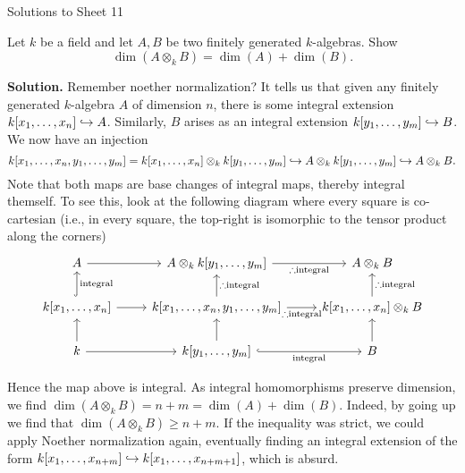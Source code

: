 \documentclass[a4paper,11pt]{article}
\begin{document}
\begin{center}
    \huge{Solutions to Sheet 11}
\end{center}

Let $k$ be a field and let $A,B$ be two finitely generated $k$-algebras.
Show 
\begin{equation*}
    \dim(A \otimes_k B) = \dim(A) + \dim(B).
\end{equation*}

\textbf{Solution.} Remember noether normalization? It tells us that given
any finitely generated $k$-algebra $A$ of dimension $n$, there is some 
integral extension $k[x_1, \dots, x_n] \hookrightarrow A$. Similarly, $B$ arises
as an integral extension $k[y_1, \dots, y_m] \hookrightarrow B$. 
We now have an injection
\begin{equation*}
    k[x_1, \dots, x_n, y_1, \dots, y_m] = k[x_1, \dots, x_n] \otimes_k k[y_1, \dots, y_m] 
    \hookrightarrow A \otimes_k k[y_1, \dots, y_m] \hookrightarrow A \otimes_k B.
\end{equation*}
Note that both maps are base changes of integral maps, thereby integral
themself. To see this, look at the following diagram where every
square is co-cartesian (i.e., in every square, the top-right is isomorphic to
the tensor product along the corners)
\begin{equation*}
\begin{tikzcd}[ampersand replacement=\&]
	A \& {A \otimes_k k[y_1, \dots, y_m] } \& {A \otimes_k B} \\
    {k[x_1, \dots, x_n]} \& {k[x_1, \dots, x_n, y_1, \dots, y_m]} \& {k[x_1, \dots, x_n] \otimes_k B} \\
	k \& {k[y_1, \dots, y_m]} \& B
	\arrow[from=3-2, to=2-2]
	\arrow[from=3-1, to=3-2]
	\arrow[from=3-1, to=2-1]
	\arrow[from=2-1, to=2-2]
	\arrow["{\text{integral}}"', hook, from=3-2, to=3-3]
	\arrow[from=3-3, to=2-3]
	\arrow["{\therefore \text{integral}}"', from=2-2, to=2-3]
	\arrow["{\text{integral}}"',hook, from=2-1, to=1-1]
	\arrow["{\therefore \text{integral}}"', from=2-2, to=1-2]
	\arrow[from=1-1, to=1-2]
	\arrow["{\therefore \text{integral}}"', from=1-2, to=1-3]
	\arrow["{\therefore \text{integral}}"', from=2-3, to=1-3]
\end{tikzcd}
\end{equation*}

Hence the map above is integral. As integral homomorphisms 
preserve dimension, we find $\dim(A \otimes_k B) = n+m = \dim(A) + \dim(B)$. 
Indeed, by going up we find that $\dim(A \otimes_k B) \geq n+m$. If 
the inequality was strict, we could apply Noether normalization again, 
eventually finding an integral extension of the form
$k[x_1, \dots, x_{n+m}] \hookrightarrow k[x_1, \dots, x_{n+m+1}]$, which is 
absurd.
\end{document}
